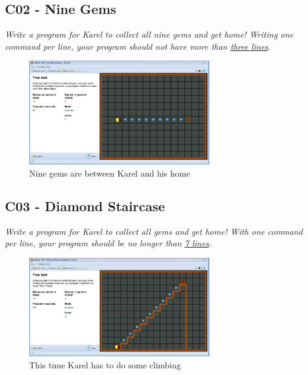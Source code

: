 \documentclass[article,A4,12pt]{llncs}
\begin{document}
\newpage

\subsection{C02 - Nine Gems}

{\em Write a program for Karel to collect all nine gems and get home! 
Writing one command per line, your program should not have more 
than \underline{three lines}}.

\begin{figure}[!ht]
\begin{center}
\includegraphics[width=0.7\textwidth]{img/c02.png}
\end{center}
\vspace{-4mm}
\caption{Nine gems are between Karel and his home}
\label{fig:c02}
\vspace{-4mm}
\end{figure}
\noindent


\subsection{C03 - Diamond Staircase}

{\em Write a program for Karel to collect all gems and get home! 
With one command per line, your program should be no longer than \underline{7 lines}.}

\begin{figure}[!ht]
\begin{center}
\includegraphics[width=0.7\textwidth]{img/c03.png}
\end{center}
\vspace{-4mm}
\caption{This time Karel has to do some climbing}
\label{fig:c03}
\vspace{-4mm}
\end{figure}
\noindent
\end{document}
